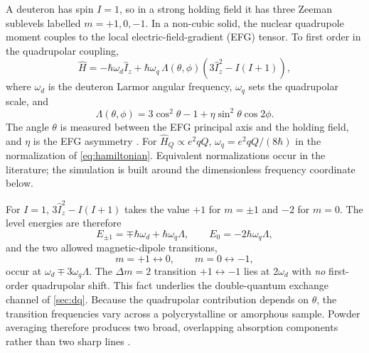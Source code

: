 \documentclass[11pt]{article}
\begin{document}
A deuteron has spin \(I=1\), so in a strong holding field it has three Zeeman sublevels labelled
\(m=+1,0,-1\). In a non-cubic solid, the nuclear quadrupole moment couples to the local
electric-field-gradient (EFG) tensor. To first order in the quadrupolar coupling,
\begin{equation}
  \hat H
  = -\hbar\omega_d \hat I_z
  + \hbar\omega_q\,
  \Lambda(\theta,\phi)
  \left(3\hat I_z^2-I(I+1)\right),
  \label{eq:hamiltonian}
\end{equation}
where \(\omega_d\) is the deuteron Larmor angular frequency, \(\omega_q\) sets the quadrupolar
scale, and
\begin{equation}
  \Lambda(\theta,\phi)
  = 3\cos^2\theta-1+\eta\sin^2\theta\cos 2\phi.
  \label{eq:lambda}
\end{equation}
The angle \(\theta\) is measured between the EFG principal axis and the holding field, and
\(\eta\) is the EFG asymmetry \cite{Abragam1961,CohenReif1957,Wasylishen2012}. For
\(\hat H_Q\propto e^2qQ\), \(\omega_q=e^2qQ/(8\hbar)\) in the normalization of
\cref{eq:hamiltonian}. Equivalent normalizations occur in the literature; the simulation is
built around the dimensionless frequency coordinate below.

For \(I=1\), \(3\hat I_z^2-I(I+1)\) takes the value \(+1\) for \(m=\pm1\) and \(-2\) for
\(m=0\). The level energies are therefore
\begin{equation}
  E_{\pm1}=\mp\hbar\omega_d+\hbar\omega_q\Lambda,\qquad E_0=-2\hbar\omega_q\Lambda,
\end{equation}
and the two allowed magnetic-dipole transitions,
\begin{equation}
  m=+1\leftrightarrow 0,
  \qquad
  m=0\leftrightarrow -1,
\end{equation}
occur at \(\omega_d\mp3\omega_q\Lambda\). The \(\Delta m=2\) transition \(+1\leftrightarrow-1\)
lies at \(2\omega_d\) with \emph{no} first-order quadrupolar shift. This fact underlies the
double-quantum exchange channel of \cref{sec:dq}. Because the quadrupolar contribution depends
on \(\theta\), the transition frequencies vary across a polycrystalline or amorphous sample.
Powder averaging therefore produces two broad, overlapping absorption components rather than two
sharp lines \cite{ClementKeller2023,Keller2026}.
\end{document}
